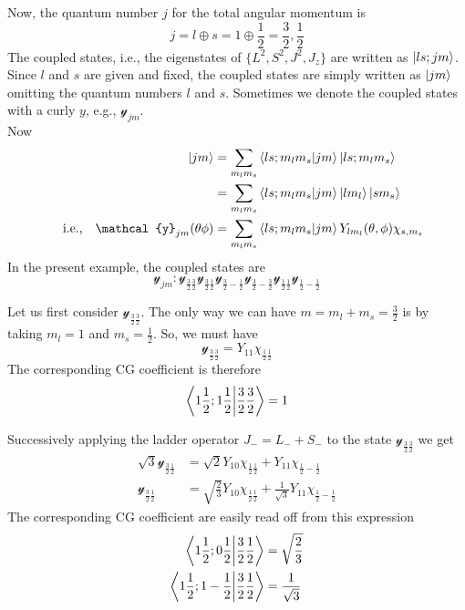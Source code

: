 
Now, the quantum number $j$ for the total angular momentum is
\begin{equation}
j = l \oplus s = 1 \oplus \frac{1}{2} = \frac{3}{2}, \frac{1}{2}
\end{equation}
The coupled states, i.e., the eigenstates of $\{L^2, S^2, J^2, J_z\}$ are written as $\ket{l s; j m}$. Since $l$ and $s$ are given and fixed, the coupled states are simply written as $\ket{j m}$ omitting the quantum numbers $l$ and $s$. Sometimes we denote the coupled states with a curly $y$, e.g., $\mathcal{y}_{j m}$.\\

Now
\begin{align*}
\ket{j m} &= \sum_{m_l m_s} \braket{l s; m_l m_s}{j m} \ket{l s; m_l m_s} \\
&= \sum_{m_l m_s} \braket{l s; m_l m_s}{j m} \ket{l m_l}\ket{s m_s} \\
\qq{i.e.,}\mathcal{y}_{j m}\qty(\theta\phi) &= \sum_{m_l m_s} \braket{l s; m_l m_s}{j m} Y_{l m_l}\qty(\theta, \phi) \chi_{s,m_s}
\end{align*}
In the present example, the coupled states are
\begin{equation}
\mathcal{y}_{j m} :
\mathcal{y}_{\frac{3}{2}\frac{3}{2}}
\mathcal{y}_{\frac{3}{2}\frac{1}{2}}
\mathcal{y}_{\frac{3}{2}-\frac{1}{2}}
\mathcal{y}_{\frac{3}{2}-\frac{3}{2}}
\mathcal{y}_{\frac{1}{2}\frac{1}{2}}
\mathcal{y}_{\frac{1}{2}-\frac{1}{2}}
\end{equation}

Let us first consider $\mathcal{y}_{\frac{3}{2}\frac{3}{2}}$. The only way we can have $m=m_l + m_s = \frac{3}{2}$ is by taking $m_l= 1$ and $m_s = \frac{1}{2}$. So, we must have
\begin{equation}
\label{chapter19.eqn1-spin-orbit}
\mathcal{y}_{\frac{3}{2}\frac{3}{2}} = Y_{1 1}\chi_{\frac{1}{2}\frac{1}{2}}
\end{equation}
The corresponding CG coefficient is therefore
\begin{equation*}
\braket{1 \frac{1}{2};1 \frac{1}{2}}{\frac{3}{2}\frac{3}{2}} = 1
\end{equation*}

Successively applying the ladder operator $J_{-} = L_{-} + S_{-}$ to the state $\mathcal{y}_{\frac{3}{2}\frac{3}{2}}$ we get
\begin{align}
\sqrt{3} \mathcal{y}_{\frac{3}{2}\frac{1}{2}} 
&= \sqrt{2} Y_{1 0}\chi_{\frac{1}{2}\frac{1}{2}} + Y_{1 1}\chi_{\frac{1}{2}-\frac{1}{2}} \nonumber\\
\mathcal{y}_{\frac{3}{2}\frac{1}{2}} 
&= \sqrt{\frac{2}{3}} Y_{1 0}\chi_{\frac{1}{2}\frac{1}{2}} 
+
\frac{1}{\sqrt{3}} Y_{1 1}\chi_{\frac{1}{2}-\frac{1}{2}} \label{chapter19.eqn2-spin-orbit}
\end{align}
The corresponding CG coefficient are easily read off from this expression
\begin{align*}
\braket{1 \frac{1}{2}; 0 \frac{1}{2}}{\frac{3}{2}\frac{1}{2}} &= \sqrt{\frac{2}{3}} \\
\braket{1 \frac{1}{2}; 1 -\frac{1}{2}}{\frac{3}{2}\frac{1}{2}} &= \frac{1}{\sqrt{3}}
\end{align*}

